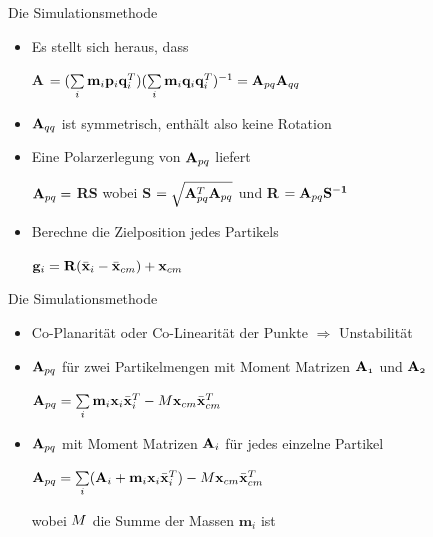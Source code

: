 \documentclass[t]{beamer}
\begin{document}
\begin{frame}{Die Simulationsmethode}
	\begin{itemize}
		\item Es stellt sich heraus, dass
		\begin{center}
			\textbf{A} $=(\sum\limits_{\mathnormal{i}}\mathnormal{\mathbf{m}_i}\mathnormal{\mathbf{p}_i}\mathnormal{\mathbf{q}_i^T})(\sum\limits_{i}\mathnormal{\mathbf{m}_i}\mathnormal{\mathbf{q}_i}\mathnormal{\mathbf{q}_i^T})^{-1}=\mathnormal{\mathbf{A}}_{pq}\mathnormal{\mathbf{A}}_{qq}$
		\end{center}
		\item $\mathnormal{\mathbf{A}}_{qq}$ ist symmetrisch, enthält also keine Rotation
		\item Eine Polarzerlegung von $\mathnormal{\mathbf{A}}_{pq}$ liefert \\
		\begin{center}
			$\mathnormal{\mathbf{A}_{pq}}=$ \textbf{RS} wobei \textbf{S} $=\sqrt{\mathnormal{\mathbf{A}_{pq}^T} \mathnormal{\mathbf{A}_{pq}}}$ und \textbf{R} $=\mathnormal{\mathbf{A}_{pq}}\mathnormal{\mathbf{S^{-1}}}$
		\end{center}
		\item Berechne die Zielposition jedes Partikels
		\begin{center}
			$\mathnormal{\mathbf{g}_i}=\mathnormal{\mathbf{R}}(\mathnormal{\mathbf{\bar{x}}_i}-\mathnormal{\mathbf{\bar{x}}_{cm}})+\mathnormal{\mathbf{x}_{cm}}$ 
		\end{center}
	\end{itemize}
\end{frame}

\begin{frame}{Die Simulationsmethode}
	\begin{itemize}
		\item Co-Planarität oder Co-Linearität der Punkte $\Rightarrow$ Unstabilität
		\item $\mathnormal{\mathbf{A}}_{pq}$ für zwei Partikelmengen mit Moment Matrizen $\mathnormal{\mathbf{A}_1}$ und $\mathnormal{\mathbf{A}_2}$ 
		\begin{center}
			$\mathnormal{\mathbf{A}}_{pq}=\sum\limits_{i}\mathnormal{\mathbf{m}_i \mathbf{x}_i \mathbf{\bar{x}}^T_i}-M\mathnormal{\mathbf{x}_{cm} \mathbf{\bar{x}}_{cm}^T}$
		\end{center}
		\item $\mathnormal{\mathbf{A}}_{pq}$ mit Moment Matrizen $\mathnormal{\mathbf{A}_i}$ für jedes einzelne Partikel
		\begin{center}
			$\mathnormal{\mathbf{A}_{pq}}=\sum\limits_{i}(\mathnormal{\mathbf{A}_i}+\mathnormal{\mathbf{m}_i \mathbf{x}_i \mathbf{\bar{x}}_i^T})-M\mathnormal{\mathbf{x}_{cm} \mathbf{\bar{x}}_{cm}^T}$
		\end{center}
		wobei $\mathnormal{M}$ die Summe der Massen $\mathbf{m}_i$ ist
	\end{itemize}
\end{frame}
\end{document}
